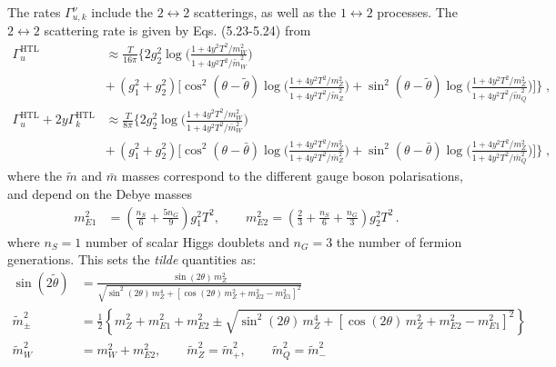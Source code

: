 \documentclass[12pt, a4paper]{article}
\begin{document}
The rates $\Gamma^\nu_{u,k}$ include the $2\leftrightarrow2$ scatterings, as well as the $1\leftrightarrow2$ processes.
The $2\leftrightarrow2$ scattering rate is given by Eqs. (5.23-5.24)
from~\cite{Ghiglieri:2018wbs}
 \begin{align}
  \Gamma^\mathrm{HTL}_{\! u} & \approx 
  \frac{T}{16\pi} 
  \biggl\{
  2 g_2^2 \log\biggl( \frac{1 + 4 y^2T^2 / m_W^2 }{ 1 + 4 y^2T^2 / \tilde{m}_W^2 } \biggr)
  \label{Gamma_HTL_u} \\ 
  & + \,
  (g_1^2 + g_2^2) 
  \biggl[
  \cos^2(\theta - \tilde{\theta}) 
   \log \biggl( \frac{1 + 4 y^2T^2 / m_Z^2}{1 + 4 y^2T^2 / \tilde{m}_Z^2 } \biggr)
  + 
  \sin^2(\theta - \tilde{\theta}) 
   \log \biggl( \frac{1 + 4 y^2T^2 / m_Z^2}{1 + 4 y^2T^2 / \tilde{m}_Q^2 } \biggr)
  \biggr]
  \biggr\} 
  \;, 
  \nonumber 
 \\
  \Gamma^\mathrm{HTL}_{\! u} + 2 y \Gamma^\mathrm{HTL}_{\!k}
  & \approx 
  \frac{T}{8\pi} 
  \biggl\{
  2 g_2^2 \log\biggl( \frac{ 1 + 4 y^2T^2 / m_W^2 }{1 + 4 y^2T^2 / \bar{m}_W^2 } \biggr)\\
  & + \,
  (g_1^2 + g_2^2) 
  \biggl[
  \cos^2(\theta - \bar{\theta}) 
   \log \biggl( \frac{1 + 4 y^2T^2 / m_Z^2 }{ 1 + 4 y^2T^2 / \bar{m}_Z^2 } \biggr)
  + 
  \sin^2(\theta - \bar{\theta}) 
   \log \biggl( \frac{1 + 4 y^2T^2 / m_Z^2 }{ 1 + 4 y^2T^2 / \bar{m}_Q^2 } \biggr)
  \biggr]
  \biggr\} 
  \;, \nonumber
 \end{align}
where the $\tilde{m}$ and $\bar{m}$ masses correspond to the different gauge boson polarisations, and depend on the Debye masses
\begin{align}
m^2_{E1} &= \left(\frac{n_S}{6} + \frac{5n_G}{9}\right)g_1^2 T^2, \qquad
m^2_{E2} = \left(\frac{2}{3} + \frac{n_S}{6} + \frac{n_G}{3}\right)g_2^2 T^2\,.
\end{align}
where $n_S = 1$ number of scalar Higgs doublets and
$n_G=3$ the number of fermion generations. This sets the \emph{tilde} quantities as:
\begin{align}
\sin(2\tilde\theta) &= \frac{\sin(2\theta)\, m_Z^2}{\sqrt{\sin^2(2\theta)\, m_Z^4 
  + [\cos(2\theta)\, m_Z^2 + m_{E2}^2 - m_{E1}^2]^2}} \\
\tilde{m}_\pm^2 &= \frac{1}{2}\left\{m_Z^2 + m_{E1}^2 + m_{E2}^2 
  \pm \sqrt{\sin^2(2\theta)\, m_Z^4 
  + [\cos(2\theta)\, m_Z^2 + m_{E2}^2 - m_{E1}^2]^2}\right\} \\
\tilde{m}_W^2 &= m_W^2 + m_{E2}^2, \qquad
\tilde{m}_Z^2 = \tilde{m}_+^2, \qquad
\tilde{m}_Q^2 = \tilde{m}_-^2
\end{align}
\end{document}
